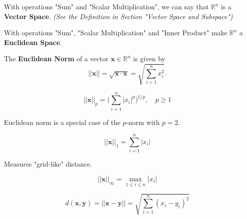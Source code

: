 \begin{remark*}
    With operations "Sum" and "Scalar Multiplication", we can say that $\mathbb{R}^{n}$ is a \textbf{Vector Space}. \textit{(See the Definition in Section "Vector Space and Subspace")}
\end{remark*}

\begin{remark*}
    With operations "Sum", "Scalar Multiplication" and "Inner Product" make $\mathbb{R}^{n}$ a \textbf{Euclidean Space}.
\end{remark*}

\begin{definition}
    The \textbf{Euclidean Norm} of a vector $\mathbf{x} \in \mathbb{R}^{n}$ is given by \begin{equation*}
        ||\mathbf{x}||=\sqrt{\mathbf{x}\cdot \mathbf{x}} = \sqrt{\sum_{i=1}^{n} x^2_{i}}.
    \end{equation*}
\end{definition}

\begin{definition}[$p$-Norm*]
    \begin{equation*}
        ||\mathbf{x}||_p = \Big(\sum_{i=1}^{n} |x_i|^p\Big)^{1/p}, \quad p \geq 1
    \end{equation*}
    \begin{remark*}
        Euclidean norm is a special case of the $p$-norm with $p=2$.
    \end{remark*}

\end{definition}


\begin{definition}
    \begin{equation*}
        ||\mathbf{x}||_1 = \sum_{i=1}^{n} |x_i|
    \end{equation*}
    \begin{remark*}
        Measures "grid-like" distance.
    \end{remark*}
\end{definition}

\begin{definition}
    \begin{equation*}
        ||\mathbf{x}||_{\infty } = \max_{1 \leq i \leq n} |x_i|
    \end{equation*}
\end{definition}

\begin{definition}
    \begin{equation*}
        d(\mathbf{x},\mathbf{y}) = ||\mathbf{x}-\mathbf{y}|| = \sqrt{\sum_{i=1}^{n} (x_i-y_i)^{2}}
    \end{equation*}
\end{definition}



